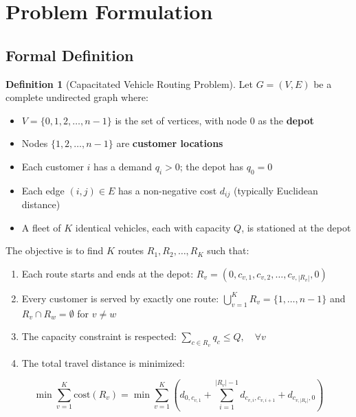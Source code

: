 \documentclass[12pt,a4paper]{article}
\theoremstyle{definition}
\newtheorem{definition}{Definition}[section]
\begin{document}
\section{Problem Formulation}

\subsection{Formal Definition}

\begin{definition}[Capacitated Vehicle Routing Problem]
Let $G = (V, E)$ be a complete undirected graph where:
\begin{itemize}
    \item $V = \{0, 1, 2, \ldots, n-1\}$ is the set of vertices, with node $0$ as the \textbf{depot}
    \item Nodes $\{1, 2, \ldots, n-1\}$ are \textbf{customer locations}
    \item Each customer $i$ has a demand $q_i > 0$; the depot has $q_0 = 0$
    \item Each edge $(i,j) \in E$ has a non-negative cost $d_{ij}$ (typically Euclidean distance)
    \item A fleet of $K$ identical vehicles, each with capacity $Q$, is stationed at the depot
\end{itemize}

The objective is to find $K$ routes $R_1, R_2, \ldots, R_K$ such that:
\begin{enumerate}
    \item Each route starts and ends at the depot: $R_v = (0, c_{v,1}, c_{v,2}, \ldots, c_{v,|R_v|}, 0)$
    \item Every customer is served by exactly one route: $\bigcup_{v=1}^{K} R_v = \{1, \ldots, n-1\}$ and $R_v \cap R_w = \emptyset$ for $v \neq w$
    \item The capacity constraint is respected: $\sum_{c \in R_v} q_c \leq Q, \quad \forall v$
    \item The total travel distance is minimized:
\end{enumerate}
\begin{equation}
\min \sum_{v=1}^{K} \text{cost}(R_v) = \min \sum_{v=1}^{K} \left( d_{0,c_{v,1}} + \sum_{i=1}^{|R_v|-1} d_{c_{v,i}, c_{v,i+1}} + d_{c_{v,|R_v|}, 0} \right)
\end{equation}
\end{definition}
\end{document}
